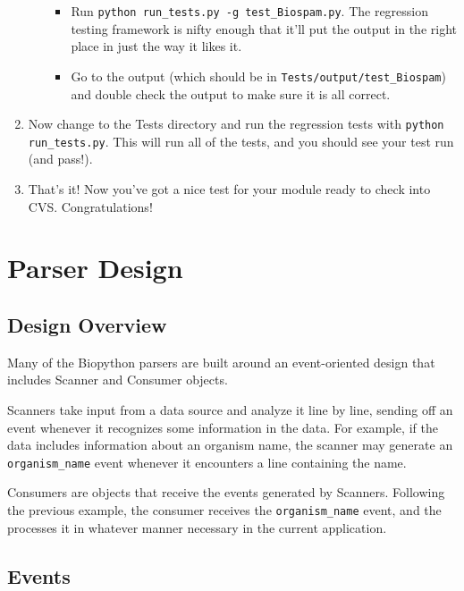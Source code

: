 \documentclass{report}
\begin{document}
\begin{enumerate}
\begin{enumerate}
   \begin{itemize}
      \item Run \verb|python run_tests.py -g test_Biospam.py|. The
            regression testing framework is nifty enough that it'll put
            the output in the right place in just the way it likes it.  
      
       \item Go to the output (which should be in \verb|Tests/output/test_Biospam|) and double check the output to make sure it is all correct.

   \end{itemize}

 \end{enumerate}
      
 \item Now change to the Tests directory and run the regression tests
       with \verb|python run_tests.py|. This will run all of the tests, and
       you should see your test run (and pass!).
      
  \item That's it! Now you've got a nice test for your module ready to check into CVS.
       Congratulations!
\end{enumerate}

\section{Parser Design}

\subsection{Design Overview}

Many of the Biopython parsers are built around an event-oriented design that includes
Scanner and Consumer objects.

Scanners take input from a data source and analyze it line by line,
sending off an event whenever it recognizes some information in the
data.  For example, if the data includes information about an organism
name, the scanner may generate an \verb|organism_name| event whenever it
encounters a line containing the name.

Consumers are objects that receive the events generated by Scanners.
Following the previous example, the consumer receives the
\verb|organism_name| event, and the processes it in whatever manner
necessary in the current application.

\subsection{Events}
\end{document}
